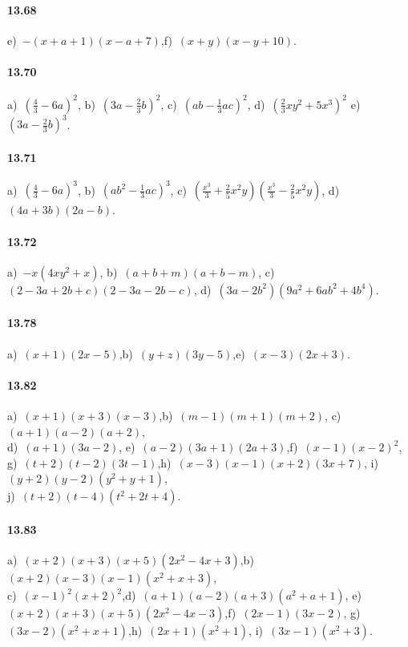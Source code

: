 \paragraph{13.68}
e)~$-(x+a+1)(x-a+7)$,\quad f)~$(x+y)(x-y+10)$.

\paragraph{13.70}
a)~$\left(\frac{4}{3}-6a\right)^2$, \quad b)~$\left(3a-\frac{2}{3}b\right)^{2}$, \quad c)~$\left(ab-\frac{1}{3}ac\right)^{2}$, \quad d)~$\left(\frac{2}{3}xy^{2}+5x^{3}\right)^2$ \quad e)~$\left(3a-\frac{2}{3}b\right)^{3}$.

\paragraph{13.71}
a)~$\left(\frac{4}{3}-6a\right)^3$, \; b)~$\left(ab^{2}-\frac{1}{3}ac\right)^{3}$, \; c)~$\left(\frac{x^{3}}{3}+\frac{2}{5}x^{2}y\right)\left(\frac{x^{3}}{3}-\frac{2}{5}x^{2}y\right)$, \; d)~$(4a+3b)(2a-b)$.

\paragraph{13.72}
a)~$-x\left(4xy^{2}+x\right)$, \quad b)~$(a+b+m)(a+b-m)$, \quad c)~$(2-3a+2b+c)(2-3a-2b-c)$, \quad d)~$\left(3a-2b^{2}\right)\left(9a^{2}+6ab^{2}+4b^{4}\right)$.

\paragraph{13.78} a)~$(x+1)(2x-5)$,\quad b)~$(y+z)(3y-5)$,\quad e)~$(x-3)\left(2x+3\right)$.

\paragraph{13.82} a)~$(x+1)(x+3)\left(x-3\right)$,\quad b)~$(m-1)(m+1)\left(m+2\right)$,\quad
c)~$(a+1)(a-2)\left(a+2\right)$,\quad \protect\\
d)~$(a+1)\left(3a-2\right)$,\quad
e)~$(a-2)(3a+1)\left(2a+3\right)$,\quad f)~$(x-1)(x-2)^{2}$,\quad
g)~$(t+2)(t-2)\left(3t-1\right)$,\quad h)~$(x-3)(x-1)(x+2)(3x+7)$,\quad
i)~$(y+2)(y-2)\left(y^{2}+y+1\right)$,\quad
\protect\\j)~$(t+2)(t-4)\left(t^{2}+2t+4\right)$.

\paragraph{13.83} a)~$(x+2)(x+3)(x+5)\left(2x^{2}-4x+3\right)$,\quad b)~$(x+2)(x-3)(x-1)\left(x^{2}+x+3\right)$,\quad
\protect\\ c)~$(x-1)^{2}\left(x+2\right)^{2}$,\quad d)~$(a+1)(a-2)(a+3)(a^{2}+a+1)$,\quad
e)~$(x+2)(x+3)(x+5)(2x^{2}-4x-3)$,\quad f)~$(2x-1)(3x-2)$,\quad
g)~$(3x-2)\left(x^{2}+x+1\right)$,\quad h)~$(2x+1)\left(x^{2}+1\right)$,\quad
i)~$(3x-1)\left(x^{2}+3\right)$.

